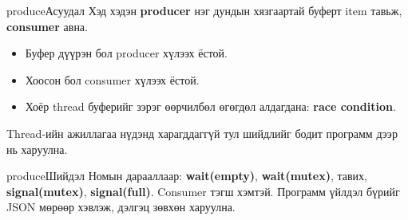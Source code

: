 \documentclass{article}
\begin{document}
\begin{minipage}[t]{0.488\linewidth}\vspace{0pt}%
\begin{block}{produce}{Асуудал}
Хэд хэдэн \textbf{producer} нэг дундын хязгаартай буферт item тавьж, \textbf{consumer} авна.
\begin{itemize}
  \item Буфер дүүрэн бол producer хүлээх ёстой.
  \item Хоосон бол consumer хүлээх ёстой.
  \item Хоёр thread буферийг зэрэг өөрчилбөл өгөгдөл алдагдана: \textbf{race condition}.
\end{itemize}
Thread-ийн ажиллагаа нүдэнд харагддаггүй тул шийдлийг бодит программ дээр нь харуулна.
\end{block}

\begin{block}{produce}{Шийдэл}
Номын дарааллаар: \textbf{wait(empty)}, \textbf{wait(mutex)}, тавих, \textbf{signal(mutex)}, \textbf{signal(full)}. Consumer тэгш хэмтэй. Программ үйлдэл бүрийг JSON мөрөөр хэвлэж, дэлгэц зөвхөн харуулна.\par\vspace{7pt}
\centering
{}
\end{block}


\end{minipage}
\end{document}
